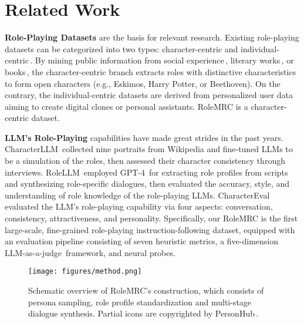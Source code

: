 \section{Related Work}
\label{sec:literature}

\noindent \textbf{Role-Playing Datasets} are the basis for relevant research. Existing role-playing datasets can be categorized into two types: character-centric and individual-centric\,\cite{chen2024persona}. By mining public information from social experience\,\cite{shao2023character,shen2023roleeval,lu-etal-2024-large,dai2024mmrole}, literary works\,\cite{li2023chatharuhi}, or books\,\cite{zhou2023characterglm,chen2024roleinteract,chen-etal-2023-large}, the character-centric branch extracts roles with distinctive characteristics to form open characters (e.g., Eskimos, Harry Potter, or Beethoven). On the contrary, the individual-centric datasets are derived from personalized user data\,\cite{li2021dialogue,ahn-etal-2023-mpchat,agrawal-etal-2023-multimodal,gao-etal-2023-livechat} aiming to create digital clones or personal assistants. RoleMRC is a character-centric dataset.

\noindent \textbf{LLM's Role-Playing} capabilities have made great strides in the past years. CharacterLLM\,\cite{shao2023character} collected nine portraits from Wikipedia and fine-tuned LLMs to be a simulation of the roles, then assessed their character consistency through interviews. RoleLLM\,\cite{wang2023rolellm} employed GPT-4\,\cite{openai2023gpt4} for extracting role profiles from scripts and synthesizing role-specific dialogues, then evaluated the accuracy, style, and understanding of role knowledge of the role-playing LLMs. CharacterEval\,\cite{tu2024charactereval} evaluated the LLM's role-playing capability via four aspects: conversation, consistency, attractiveness, and personality. Specifically, our RoleMRC is the first large-scale, fine-grained role-playing instruction-following dataset, equipped with an evaluation pipeline consisting of seven heuristic metrics, a five-dimension LLM-as-a-judge\,\cite{zheng2024judging} framework, and neural probes.

\begin{figure*}[t]
    \centering
    \texttt{[image: figures/method.png]}
    \vspace{-6mm}
    \caption{Schematic overview of RoleMRC's construction, which consists of persona sampling, role profile standardization and multi-stage dialogue synthesis. Partial icons are copyrighted by PersonHub\,\cite{ge2024scaling}.}
    \label{fig:method}
    \vspace{-3mm}
\end{figure*}